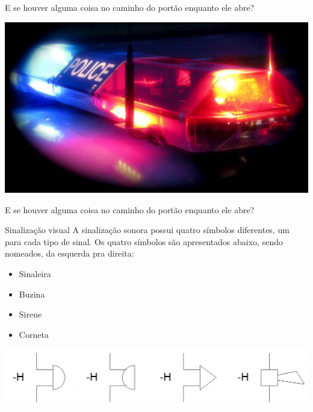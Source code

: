 \begin{frame}{E se houver alguma coisa no caminho do portão enquanto ele abre?}
\centerline{\includegraphics[width=\linewidth]{Figuras/Ch05/fig20.jpg}}
\end{frame}



\begin{frame}{E se houver alguma coisa no caminho do portão enquanto ele abre?}
\begin{block}{Sinalização visual}
	A sinalização sonora possui quatro símbolos diferentes, um para cada tipo de sinal. Os quatro símbolos são apresentados abaixo, sendo nomeados, da esquerda pra direita:
	
	\begin{itemize}
		\item Sinaleira
		\item Buzina
		\item Sirene
		\item Corneta
	\end{itemize}
	
\end{block}

\medskip

\centerline{\includegraphics[width=0.8\linewidth]{Figuras/Ch05/fig21.jpg}}
\end{frame}

